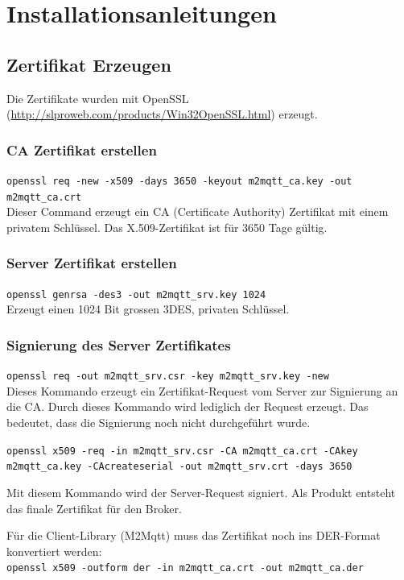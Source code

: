 \chapter{Installationsanleitungen} \label{ch:manual}
\section*{Zertifikat Erzeugen}
Die Zertifikate wurden mit OpenSSL (\url{http://slproweb.com/products/Win32OpenSSL.html}) erzeugt.

\subsection*{CA Zertifikat erstellen}
\lstinline!openssl req -new -x509 -days 3650 -keyout m2mqtt_ca.key -out m2mqtt_ca.crt! \\
Dieser Command erzeugt ein CA (Certificate Authority) Zertifikat mit einem privatem Schlüssel. Das X.509-Zertifikat ist für 3650 Tage gültig.

\subsection*{Server Zertifikat erstellen}
\lstinline!openssl genrsa -des3 -out m2mqtt_srv.key 1024! \\
Erzeugt einen 1024 Bit grossen 3DES, privaten Schlüssel. 

\subsection*{Signierung des Server Zertifikates}
\lstinline!openssl req -out m2mqtt_srv.csr -key m2mqtt_srv.key -new! \\
Dieses Kommando erzeugt ein Zertifikat-Request vom Server zur Signierung an die CA. Durch dieses Kommando wird lediglich der Request erzeugt. Das bedeutet, dass die Signierung noch nicht durchgeführt wurde.

\lstinline!openssl x509 -req -in m2mqtt_srv.csr -CA m2mqtt_ca.crt -CAkey m2mqtt_ca.key -CAcreateserial -out m2mqtt_srv.crt -days 3650!

Mit diesem Kommando wird der Server-Request signiert. Als Produkt entsteht das finale Zertifikat für den Broker.

Für die Client-Library (M2Mqtt) muss das Zertifikat noch ins DER-Format konvertiert werden: \\
\lstinline!openssl x509 -outform der -in m2mqtt_ca.crt -out m2mqtt_ca.der!

